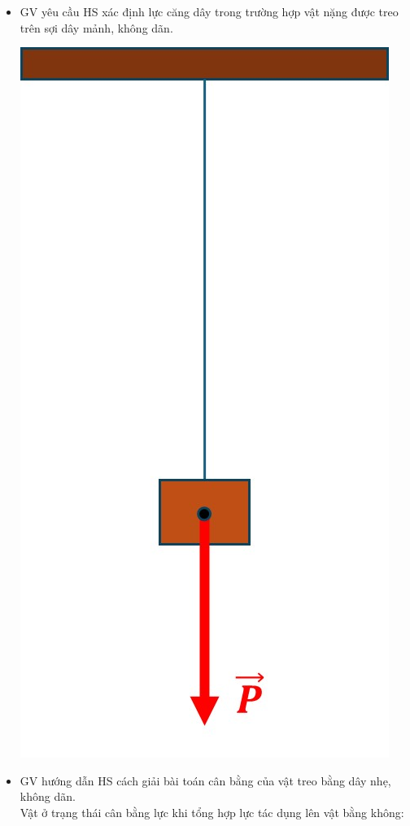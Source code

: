 {\begin{itemize}[label=-]
		\item GV yêu cầu HS xác định lực căng dây trong trường hợp vật nặng được treo trên sợi dây mảnh, không dãn.
		\begin{center}
			\includegraphics[scale=0.4]{figs/G10-BAI11-11}
		\end{center}
		\item 	GV hướng dẫn HS cách giải bài toán cân bằng của vật treo bằng dây nhẹ, không dãn.\\
			Vật ở trạng thái cân bằng lực khi tổng hợp lực tác dụng lên vật bằng không:

\end{itemize}}
